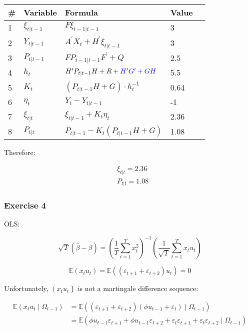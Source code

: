 {{\begin{center}
\begin{tabular}{|l|ll|l|l|}
\hline \# & Variable & Formula & Value \\
\hline 1 & $\xi_{t | t-1}$ & $F \xi_{t-1 | t-1}$ & 3 \\
2 & $Y_{t | t-1}$ & $A^{\prime} X_{t}+H^{\prime} \xi_{t | t-1}$ & 3 \\
3 & $P_{t | t-1}$ & $F P_{t-1 | t-1} F^{\prime}+Q$ & 2.5 \\
4 & $h_{t}$ & $H^{\prime} P_{t | t-1} H+R + \color{blue} H^\prime G^\prime + GH \color{black}$ & 5.5 \\
5 & $K_{t}$ & $\left( P_{t | t-1} H + G \right) \cdot h_{t}^{-1}$ & 0.64 \\
6 & $\eta_{t}$ & $Y_{t}-Y_{t | t-1}$ & -1 \\
7 & $\xi_{t | t}$ & $\xi_{t | t-1}+K_{t} \eta_{t}$ & 2.36 \\
8 & $P_{t | t}$ & $P_{t | t-1}-K_{t} \left( P_{t | t-1} H + G \right)$ & 1.08 \\
\hline
\end{tabular}
\end{center}

Therefore:

$$
\begin{aligned}
& \xi_{t | t}=2.36 \\
& P_{t | t}=1.08
\end{aligned}
$$
}
{
\subsubsection*{Exercise 4}

\begin{enumerate}[label=(\alph*)]
{\item 
OLS: 

$$
\sqrt{T}(\hat{\beta}-\beta)=\left(\frac{1}{T} \sum_{t=1}^{T} x_{t}^{2}\right)^{-1}\left(\frac{1}{\sqrt{T}} \sum_{t=1}^{T} x_{t} u_{t}\right)
$$

$$
\mathbb{E}\left(x_{t} u_{t}\right)=\mathbb{E}\left(\left(\varepsilon_{t+1}+\varepsilon_{t+2}\right) u_{t}\right)=0
$$

Unfortunately, $\left(x_{t} u_{t}\right\}$ is not a martingale difference sequence:

$$
\begin{aligned}
\mathbb{E}\left(x_{t}u_t \mid \Omega_{t-1}\right) & =\mathbb{E}\left(\left(\varepsilon_{t+1}+\varepsilon_{t+2}\right)\left(\phi u_{t-1}+\varepsilon_{t}\right) \mid \Omega_{t-1}\right) \\
& =\mathbb{E}\left(\phi u_{t-1} \varepsilon_{t+1}+\phi u_{t-1} \varepsilon_{t+2}+\varepsilon_{t} \varepsilon_{t+1}+\varepsilon_{t} \varepsilon_{t+2} \mid \Omega_{t-1}\right)
\end{aligned}
$$

}
\end{enumerate}}}
